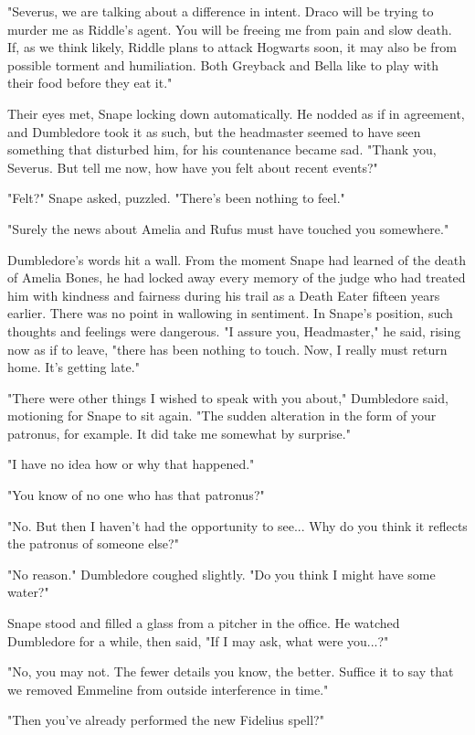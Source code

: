 \documentclass[a4paper,11pt]{article}
\begin{document}
"Severus, we are talking about a difference in intent. Draco will be trying to murder me as Riddle's agent. You will be freeing me from pain and slow death. If, as we think likely, Riddle plans to attack Hogwarts soon, it may also be from possible torment and humiliation. Both Greyback and Bella like to play with their food before they eat it."

Their eyes met, Snape locking down automatically. He nodded as if in agreement, and Dumbledore took it as such, but the headmaster seemed to have seen something that disturbed him, for his countenance became sad. "Thank you, Severus. But tell me now, how have you felt about recent events?"

"Felt?" Snape asked, puzzled. "There's been nothing to feel."

"Surely the news about Amelia and Rufus must have touched you somewhere."

Dumbledore's words hit a wall. From the moment Snape had learned of the death of Amelia Bones, he had locked away every memory of the judge who had treated him with kindness and fairness during his trail as a Death Eater fifteen years earlier. There was no point in wallowing in sentiment. In Snape's position, such thoughts and feelings were dangerous. "I assure you, Headmaster," he said, rising now as if to leave, "there has been nothing to touch. Now, I really must return home. It's getting late."

"There were other things I wished to speak with you about," Dumbledore said, motioning for Snape to sit again. "The sudden alteration in the form of your patronus, for example. It did take me somewhat by surprise."

"I have no idea how or why that happened."

"You know of no one who has that patronus?"

"No. But then I haven't had the opportunity to see... Why do you think it reflects the patronus of someone else?"

"No reason." Dumbledore coughed slightly. "Do you think I might have some water?"

Snape stood and filled a glass from a pitcher in the office. He watched Dumbledore for a while, then said, "If I may ask, what were you...?"

"No, you may not. The fewer details you know, the better. Suffice it to say that we removed Emmeline from outside interference in time."

"Then you've already performed the new Fidelius spell?"
\end{document}
